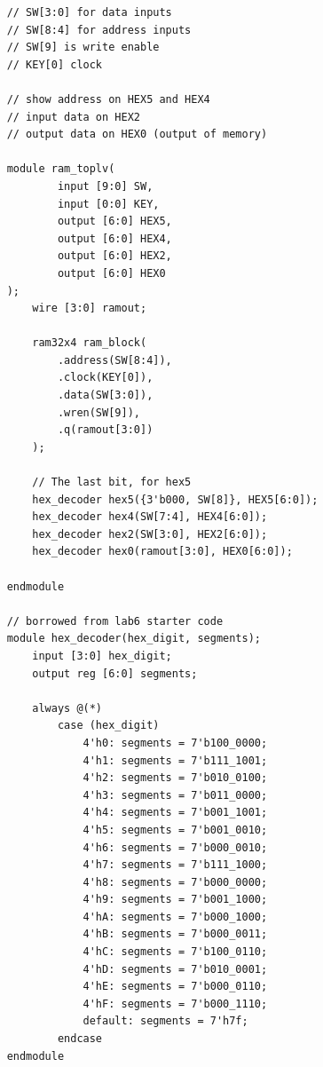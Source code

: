 \documentclass{article}
\begin{document}
\begin{verbatim}
    // SW[3:0] for data inputs
    // SW[8:4] for address inputs
    // SW[9] is write enable
    // KEY[0] clock
    
    // show address on HEX5 and HEX4
    // input data on HEX2
    // output data on HEX0 (output of memory)
    
    module ram_toplv(
            input [9:0] SW,
            input [0:0] KEY, 
            output [6:0] HEX5, 
            output [6:0] HEX4, 
            output [6:0] HEX2,
            output [6:0] HEX0
    );
        wire [3:0] ramout;
        
        ram32x4 ram_block(
            .address(SW[8:4]),
            .clock(KEY[0]),
            .data(SW[3:0]),
            .wren(SW[9]),
            .q(ramout[3:0])
        );
        
        // The last bit, for hex5
        hex_decoder hex5({3'b000, SW[8]}, HEX5[6:0]);
        hex_decoder hex4(SW[7:4], HEX4[6:0]);
        hex_decoder hex2(SW[3:0], HEX2[6:0]);
        hex_decoder hex0(ramout[3:0], HEX0[6:0]);
    
    endmodule
    
    // borrowed from lab6 starter code
    module hex_decoder(hex_digit, segments);
        input [3:0] hex_digit;
        output reg [6:0] segments;
    
        always @(*)
            case (hex_digit)
                4'h0: segments = 7'b100_0000;
                4'h1: segments = 7'b111_1001;
                4'h2: segments = 7'b010_0100;
                4'h3: segments = 7'b011_0000;
                4'h4: segments = 7'b001_1001;
                4'h5: segments = 7'b001_0010;
                4'h6: segments = 7'b000_0010;
                4'h7: segments = 7'b111_1000;
                4'h8: segments = 7'b000_0000;
                4'h9: segments = 7'b001_1000;
                4'hA: segments = 7'b000_1000;
                4'hB: segments = 7'b000_0011;
                4'hC: segments = 7'b100_0110;
                4'hD: segments = 7'b010_0001;
                4'hE: segments = 7'b000_0110;
                4'hF: segments = 7'b000_1110;
                default: segments = 7'h7f;
            endcase
    endmodule    
\end{verbatim}
\end{document}
